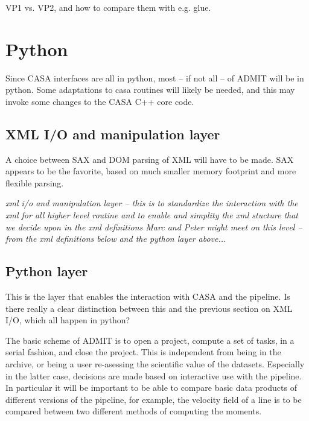 \documentclass{article}
\begin{document}
VP1 vs. VP2, and how to compare them with e.g. glue.




\section{Python}

Since CASA interfaces are all in python, most -- if not all -- of
ADMIT will be in python. Some adaptations to casa routines will
likely be needed, and this may invoke some changes to the CASA
C++ core code.

\subsection{XML I/O and manipulation layer}

A choice between SAX and DOM parsing of XML will have to be made.
SAX appears to be the favorite, based on much smaller memory
footprint and more flexible parsing.




{\it xml i/o and manipulation layer -- this is to standardize
the interaction with the xml for all higher level
routine and to enable and simplity the xml stucture
that we decide upon in the xml definitions
Marc and Peter might meet on this level -- from the
xml definitions below and the python layer above...}



\subsection{Python layer}

This is the layer that enables the interaction with
CASA and the pipeline. Is there really a clear distinction 
between this and the previous section on XML I/O, which
all happen in python?

The basic scheme of ADMIT is to open a project, compute a set of
tasks, in a serial fashion, and close the project. This is independent
from being in the archive, or being a user re-asessing the scientific
value of the datasets. Especially in the latter case, decisions are
made based on interactive use with the pipeline. In particular it will
be important to be able to compare basic data products of different
versions of the pipeline, for example, the velocity field of a line is
to be compared between two different methods of computing the moments.
\end{document}
